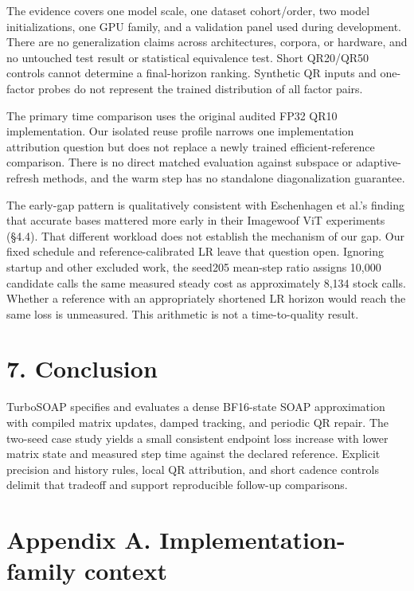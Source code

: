 \documentclass[
  10pt,
]{article}
\begin{document}
The evidence covers one model scale, one dataset cohort/order, two model
initializations, one GPU family, and a validation panel used during
development. There are no generalization claims across architectures,
corpora, or hardware, and no untouched test result or statistical
equivalence test. Short QR20/QR50 controls cannot determine a
final-horizon ranking. Synthetic QR inputs and one-factor probes do not
represent the trained distribution of all factor pairs.

The primary time comparison uses the original audited FP32 QR10
implementation. Our isolated reuse profile narrows one implementation
attribution question but does not replace a newly trained
efficient-reference comparison. There is no direct matched evaluation
against subspace or adaptive-refresh methods, and the warm step has no
standalone diagonalization guarantee.

The early-gap pattern is qualitatively consistent with Eschenhagen et
al.'s finding that accurate bases mattered more early in their Imagewoof
ViT experiments (§4.4). That different workload does not establish the
mechanism of our gap. Our fixed schedule and reference-calibrated LR
leave that question open. Ignoring startup and other excluded work, the
seed205 mean-step ratio assigns 10,000 candidate calls the same measured
steady cost as approximately 8,134 stock calls. Whether a reference with
an appropriately shortened LR horizon would reach the same loss is
unmeasured. This arithmetic is not a time-to-quality result.

\hypertarget{conclusion}{%
\section{7. Conclusion}\label{conclusion}}

TurboSOAP specifies and evaluates a dense BF16-state SOAP approximation
with compiled matrix updates, damped tracking, and periodic QR repair.
The two-seed case study yields a small consistent endpoint loss increase
with lower matrix state and measured step time against the declared
reference. Explicit precision and history rules, local QR attribution,
and short cadence controls delimit that tradeoff and support
reproducible follow-up comparisons.

\hypertarget{appendix-a.-implementation-family-context}{%
\section{Appendix A. Implementation-family
context}\label{appendix-a.-implementation-family-context}}
\end{document}
